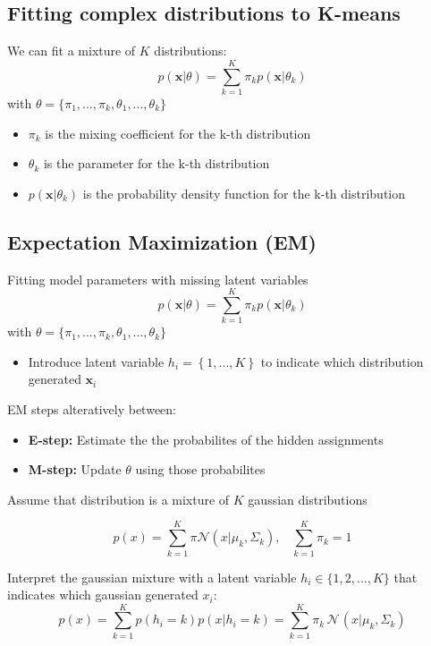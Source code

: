 \documentclass[12pt,a4paper]{article}
\begin{document}
\subsection{Fitting complex distributions to K-means}
We can fit a mixture of $K$ distributions:
\[
p(\mathbf{x}|\theta) = \sum_{k=1}^{K} \pi_k p(\mathbf{x}|\theta_k)
\]
with $\theta = \{\pi_1,...,\pi_k,\theta_1,...,\theta_k\}$
\begin{itemize}
    \item $\pi_k$ is the mixing coefficient for the k-th distribution
    \item $\theta_k$ is the parameter for the k-th distribution
    \item $p(\mathbf{x}|\theta_k)$ is the probability density function for the k-th distribution
\end{itemize}

\subsection{Expectation Maximization (EM)}
Fitting model parameters with missing latent variables
\[
p(\mathbf{x}|\theta) = \sum_{k=1}^{K} \pi_k p(\mathbf{x}|\theta_k)
\]
with $\theta = \{\pi_1,...,\pi_k,\theta_1,...,\theta_k\}$
\begin{itemize}
    \item Introduce latent variable $h_i = \left\{1,...,K\right\}$ to indicate which distribution generated $\mathbf{x}_i$
\end{itemize}
EM steps alteratively between:
\begin{itemize}
    \item \textbf{E-step:} Estimate the the probabilites of the hidden assignments
    \item \textbf{M-step:} Update $\theta$ using those probabilites
\end{itemize}

Assume that distribution is a mixture of $K$ gaussian distributions

\[
p(x) = \sum_{k=1}^{K} \pi \mathcal{N}(x|\mu_k, \Sigma_k), \hspace{10pt} \sum_{k=1}^{K} \pi_k = 1
\]

Interpret the gaussian mixture with a latent variable $h_i \in \{1, 2, \ldots, K\}$ that indicates which gaussian generated $x_i$:
\[
p(x) = \sum_{k=1}^{K} p(h_i = k)p(x|h_i = k) = \sum_{k=1}^{K} \pi_k \hspace{2pt} \mathcal{N} \hspace{1pt}(x|\mu_k, \Sigma_k)
\]
\end{document}
